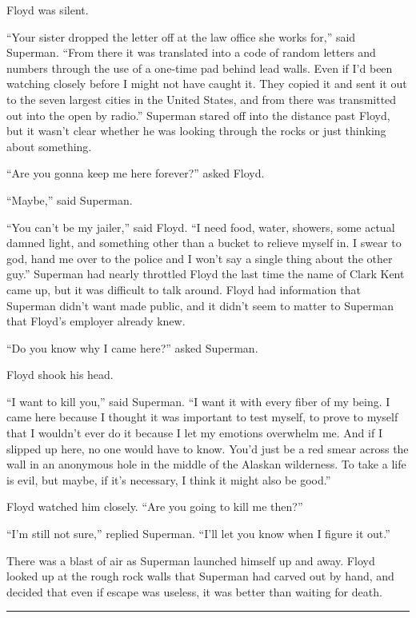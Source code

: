 \documentclass[ebook,12pt]{memoir}
\begin{document}
Floyd was silent.

``Your sister dropped the letter off at the law office she works for,''
said Superman. ``From there it was translated into a code of random
letters and numbers through the use of a one‐time pad behind lead walls.
Even if I'd been watching closely before I might not have caught it.
They copied it and sent it out to the seven largest cities in the United
States, and from there was transmitted out into the open by radio.''
Superman stared off into the distance past Floyd, but it wasn't clear
whether he was looking through the rocks or just thinking about
something.

``Are you gonna keep me here forever?'' asked Floyd.

``Maybe,'' said Superman.

``You can't be my jailer,'' said Floyd. ``I need food, water, showers,
some actual damned light, and something other than a bucket to relieve
myself in. I swear to god, hand me over to the police and I won't say a
single thing about the other guy.'' Superman had nearly throttled Floyd
the last time the name of Clark Kent came up, but it was difficult to
talk around. Floyd had information that Superman didn't want made
public, and it didn't seem to matter to Superman that Floyd's employer
already knew.

``Do you know why I came here?'' asked Superman.

Floyd shook his head.

``I want to kill you,'' said Superman. ``I want it with every fiber of
my being. I came here because I thought it was important to test myself,
to prove to myself that I wouldn't ever do it because I let my emotions
overwhelm me. And if I slipped up here, no one would have to know. You'd
just be a red smear across the wall in an anonymous hole in the middle
of the Alaskan wilderness. To take a life is evil, but maybe, if it's
necessary, I think it might also be good.''

Floyd watched him closely. ``Are you going to kill me then?''

``I'm still not sure,'' replied Superman. ``I'll let you know when I
figure it out.''

There was a blast of air as Superman launched himself up and away. Floyd
looked up at the rough rock walls that Superman had carved out by hand,
and decided that even if escape was useless, it was better than waiting
for death.

\begin{center}\rule{0.5\linewidth}{\linethickness}\end{center}
\end{document}
